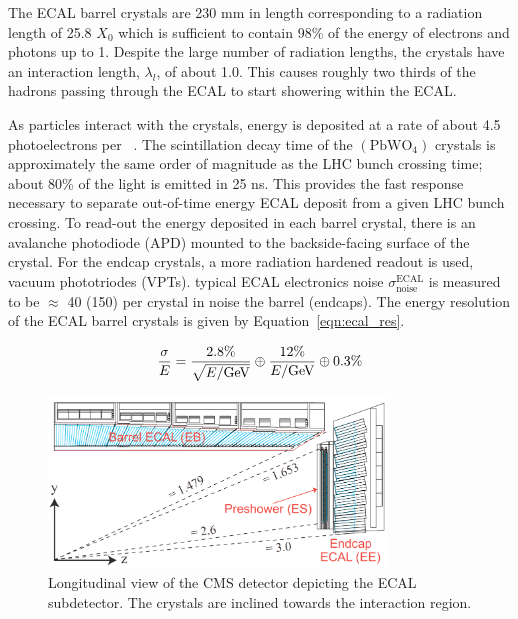 The ECAL barrel crystals are 230 mm in length corresponding to a
radiation length of 25.8 $X_{0}$ which is sufficient to contain 98\% of the energy
of electrons and photons up to 1\TeV. Despite the large number of radiation lengths,
the crystals have an interaction length, $\lambda_{l}$, of about 1.0. This causes
roughly two thirds of the hadrons passing through the ECAL to start showering
within the ECAL. 

As particles interact with the crystals, energy is deposited at a rate of about 4.5
photoelectrons per \MeV~\cite{dafinei_auffray_lecoq_schneegans_1994}.
The scintillation decay time of the $(\textrm{PbWO}_{4})$ crystals is approximately the
same order of magnitude as the LHC bunch crossing time; about 80\% of the light is emitted in 25 ns.
This provides the fast response necessary to separate out-of-time energy ECAL deposit
from a given LHC bunch crossing. To read-out the energy deposited in each barrel
crystal, there is an avalanche photodiode (APD) mounted to the backside-facing surface
of the crystal. For the endcap crystals, a more radiation hardened readout is used,
vacuum phototriodes (VPTs). typical ECAL electronics noise 
$\sigma ^{\text{ECAL}} _{\text{noise}}$ is measured to be $\approx$ 40 (150) \MeV 
per crystal in noise the barrel (endcaps).
The energy resolution of the ECAL barrel crystals is given by
Equation~\ref{eqn:ecal_res}.

\begin{equation}
\label{eqn:ecal_res}
\frac{\sigma}{E} = \frac{2.8\%}{\sqrt{E/\mathrm{GeV}}} \oplus \frac{12\%}{E/\mathrm{GeV}} \oplus 0.3\%
\end{equation}



\begin{figure}[htbp]
\centering
     \includegraphics[width=0.8\textwidth]{cms_and_lhc/plots/cms_ecal.png}
     \caption{
Longitudinal view of the CMS detector depicting the ECAL subdetector.
The crystals are inclined towards the interaction region.
     }
     \label{fig:cms_ecal}
\end{figure}



